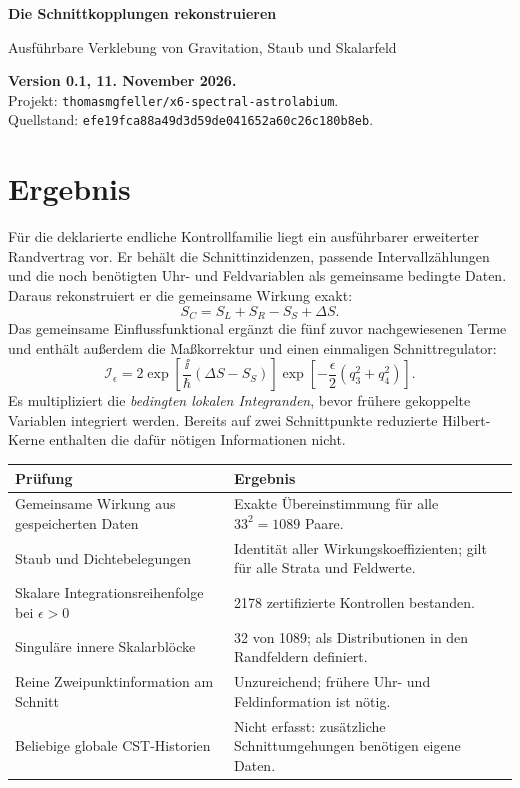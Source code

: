 \documentclass[10pt,a4paper]{article}
\begin{document}
{\color{ink}\LARGE\bfseries Die Schnittkopplungen rekonstruieren}\par
{\large Ausführbare Verklebung von Gravitation, Staub und Skalarfeld}\par
\textbf{Version 0.1, 11. November 2026.}\\
Projekt: \texttt{thomasmgfeller/x6-spectral-astrolabium}.\\
Quellstand: \texttt{efe19fca88a49d3d59de041652a60c26c180b8eb}.

\section*{Ergebnis}
Für die deklarierte endliche Kontrollfamilie liegt ein ausführbarer erweiterter
Randvertrag vor. Er behält die Schnittinzidenzen, passende Intervallzählungen
und die noch benötigten Uhr- und Feldvariablen als gemeinsame bedingte Daten.
Daraus rekonstruiert er die gemeinsame Wirkung exakt:
\[
 S_C=S_L+S_R-S_S+\Delta S.
\]
Das gemeinsame Einflussfunktional ergänzt die fünf zuvor nachgewiesenen Terme
und enthält außerdem die Maßkorrektur und einen einmaligen Schnittregulator:
\[
 \boxed{\ \mathcal I_\epsilon
 =2\exp\!\left[\frac{\ii}{\hbar}(\Delta S-S_S)\right]
       \exp\!\left[-\frac{\epsilon}{2}(q_3^2+q_4^2)\right].\ }
\]
Es multipliziert die \emph{bedingten lokalen Integranden}, bevor frühere
gekoppelte Variablen integriert werden. Bereits auf zwei Schnittpunkte
reduzierte Hilbert-Kerne enthalten die dafür nötigen Informationen nicht.

\begin{center}\begin{tabular}{p{.48\linewidth}p{.43\linewidth}}\toprule
Prüfung & Ergebnis\\\midrule
Gemeinsame Wirkung aus gespeicherten Daten & Exakte Übereinstimmung für alle $33^2=1089$ Paare.\\
Staub und Dichtebelegungen & Identität aller Wirkungskoeffizienten; gilt für alle Strata und Feldwerte.\\
Skalare Integrationsreihenfolge bei $\epsilon>0$ & 2178 zertifizierte Kontrollen bestanden.\\
Singuläre innere Skalarblöcke & 32 von 1089; als Distributionen in den Randfeldern definiert.\\
Reine Zweipunktinformation am Schnitt & Unzureichend; frühere Uhr- und Feldinformation ist nötig.\\
Beliebige globale CST-Historien & Nicht erfasst: zusätzliche Schnittumgehungen benötigen eigene Daten.\\\bottomrule
\end{tabular}\end{center}
\end{document}
